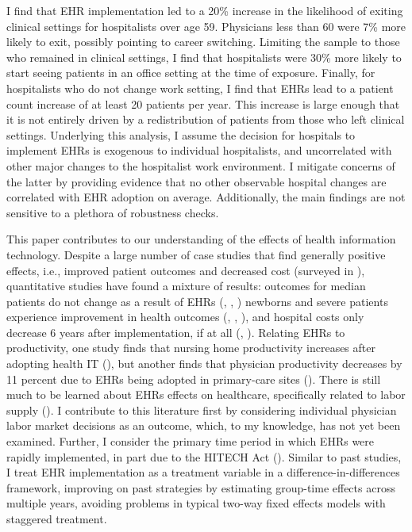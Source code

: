 \documentclass[12pt]{article}
\begin{document}
I find that EHR implementation led to a 20\% increase in the likelihood of exiting clinical settings for hospitalists over age 59. Physicians less than 60 were 7\% more likely to exit, possibly pointing to career switching. Limiting the sample to those who remained in clinical settings, I find that hospitalists were 30\% more likely to start seeing patients in an office setting at the time of exposure. Finally, for hospitalists who do not change work setting, I find that EHRs lead to a patient count increase of at least 20 patients per year. This increase is large enough that it is not entirely driven by a redistribution of patients from those who left clinical settings. Underlying this analysis, I assume the decision for hospitals to implement EHRs is exogenous to individual hospitalists, and uncorrelated with other major changes to the hospitalist work environment. I mitigate concerns of the latter by providing evidence that no other observable hospital changes are correlated with EHR adoption on average. Additionally, the main findings are not sensitive to a plethora of robustness checks. 

This paper contributes to our understanding of the effects of health information technology. Despite a large number of case studies that find generally positive effects, i.e., improved patient outcomes and decreased cost (surveyed in \cite{Buntin2011TheResults}), quantitative studies have found a mixture of results: outcomes for median patients do not change as a result of EHRs (\cite{Agha2014TheCare}, \cite{McCullough2016HealthCoordination}, \cite{Meyerhoefer}) newborns and severe patients experience improvement in health outcomes (\cite{Miller2009}, \cite{Freedman2015}, \cite{McCullough2016HealthCoordination}), and hospital costs only decrease 6 years after implementation, if at all (\cite{Agha2014TheCare}, \cite{dranove2014trillion}). Relating EHRs to productivity, one study finds that nursing home productivity increases after adopting health IT (\cite{Hitt2016}), but another finds that physician productivity decreases by 11 percent due to EHRs being adopted in primary-care sites (\cite{Meyerhoefer}). There is still much to be learned about EHRs effects on healthcare, specifically related to labor supply (\cite{NBERw29218}). I contribute to this literature first by considering individual physician labor market decisions as an outcome, which, to my knowledge, has not yet been examined. Further, I consider the primary time period in which EHRs were rapidly implemented, in part due to the HITECH Act (\cite{dranove2015investment}). Similar to past studies, I treat EHR implementation as a treatment variable in a difference-in-differences framework, improving on past strategies by estimating group-time effects across multiple years, avoiding problems in typical two-way fixed effects models with staggered treatment.
\end{document}
